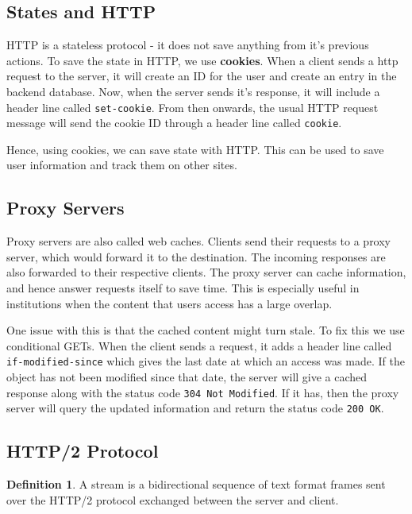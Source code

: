 \documentclass[12pt,letterpaper]{article}
\theoremstyle{definition}
\newtheorem{definition}{Definition}[section] %
\begin{document}
\subsection{States and HTTP}

HTTP is a stateless protocol - it does not save anything from it's previous actions. To save the state in HTTP, we use \textbf{cookies}. When a client sends a http request to the server, it will create an ID for the user and create an entry in the backend database. Now, when the server sends it's response, it will include a header line called \texttt{set-cookie}. From then onwards, the usual HTTP request message will send the cookie ID through a header line called \texttt{cookie}.

Hence, using cookies, we can save state with HTTP. This can be used to save user information and track them on other sites.

\subsection{Proxy Servers}

Proxy servers are also called web caches. Clients send their requests to a proxy server, which would forward it to the destination. The incoming responses are also forwarded to their respective clients. The proxy server can cache information, and hence answer requests itself to save time. This is especially useful in institutions when the content that users access has a large overlap.

One issue with this is that the cached content might turn stale. To fix this we use conditional GETs. When the client sends a request, it adds a header line called \texttt{if-modified-since} which gives the last date at which an access was made. If the object has not been modified since that date, the server will give a cached response along with the status code \texttt{304 Not Modified}. If it has, then the proxy server will query the updated information and return the status code \texttt{200 OK}.

\subsection{HTTP/2 Protocol}

\begin{definition}
  A stream is a bidirectional sequence of text format frames sent over the HTTP/2 protocol exchanged between the server and client.  
\end{definition}
\end{document}
